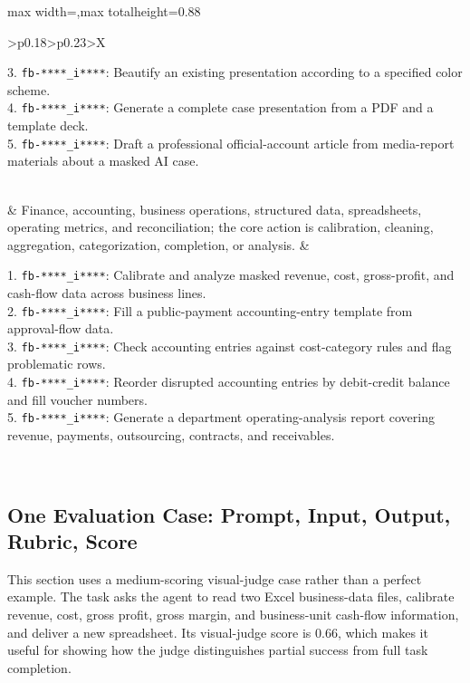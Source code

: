 \documentclass{llmxive}
\providecommand{\liteset}{Lite}
\begin{document}
\begin{table}[p]
\begin{adjustbox}{max width=\textwidth,max totalheight=0.88\textheight}
\begin{tabularx}{\textwidth}{>{\arraybackslash}p{0.18\textwidth}>{\arraybackslash}p{0.23\textwidth}>{\arraybackslash}X}
\begin{minipage}[t]{\linewidth}
3. \texttt{fb-****\_i****}: Beautify an existing presentation according to a specified color scheme.\\
4. \texttt{fb-****\_i****}: Generate a complete case presentation from a PDF and a template deck.\\
5. \texttt{fb-****\_i****}: Draft a professional official-account article from media-report materials about a masked AI case.\vspace{1pt}
\end{minipage} \\
\midrule
{}
& Finance, accounting, business operations, structured data, spreadsheets, operating metrics, and reconciliation; the core action is calibration, cleaning, aggregation, categorization, completion, or analysis.
& \begin{minipage}[t]{\linewidth}\vspace{0pt}
1. \texttt{fb-****\_i****}: Calibrate and analyze masked revenue, cost, gross-profit, and cash-flow data across business lines.\\
2. \texttt{fb-****\_i****}: Fill a public-payment accounting-entry template from approval-flow data.\\
3. \texttt{fb-****\_i****}: Check accounting entries against cost-category rules and flag problematic rows.\\
4. \texttt{fb-****\_i****}: Reorder disrupted accounting entries by debit-credit balance and fill voucher numbers.\\
5. \texttt{fb-****\_i****}: Generate a department operating-analysis report covering revenue, payments, outsourcing, contracts, and receivables.\vspace{1pt}
\end{minipage} \\
\bottomrule
\end{tabularx}
\end{adjustbox}
\caption{Representative tasks from the \liteset{} subset by role class. Each row gives the classification boundary and five release-safe prompt excerpts.}
\label{ecblink:tab:case-representative-prompts}
\end{table}

\subsection{One Evaluation Case: Prompt, Input, Output, Rubric, Score}
This section uses a medium-scoring visual-judge case rather than a perfect example. The task asks the agent to read two Excel business-data files, calibrate revenue, cost, gross profit, gross margin, and business-unit cash-flow information, and deliver a new spreadsheet. Its visual-judge score is 0.66, which makes it useful for showing how the judge distinguishes partial success from full task completion.
\end{document}
